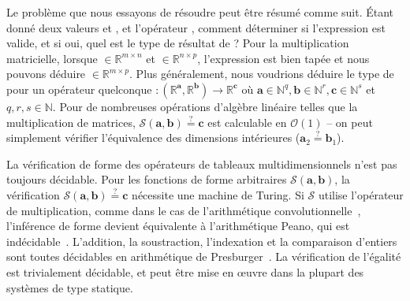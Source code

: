 Le problème que nous essayons de résoudre peut être résumé comme suit. Étant donné deux valeurs  et , et l'opérateur \inline{\$}, comment déterminer si l'expression  est valide, et si oui, quel est le type de résultat de ? Pour la multiplication matricielle, lorsque  $\in \mathbb{R}^{m \times n}$ et  $\in \mathbb{R}^{n \times p}$, l'expression est bien tapée et nous pouvons déduire  $\in \mathbb{R}^{m \times p}$. Plus généralement, nous voudrions déduire le type de  pour un opérateur quelconque  $ : (\mathbb{R}^\mathbf{a}, \mathbb{R}^\mathbf{b}) \rightarrow \mathbb{R}^\mathbf{c}$ où $\mathbf{a} \in \mathbb{N}^q, \mathbf{b} \in \mathbb{N}^r, \mathbf{c} \in \mathbb{N}^s$ et $q, r, s \in \mathbb{N}$. Pour de nombreuses opérations d'algèbre linéaire telles que la multiplication de matrices, $\mathcal{S}(\mathbf a, \mathbf b) \stackrel{?}{=} \mathbf c$ est calculable en $\mathcal{O}(1)$ -- on peut simplement vérifier l'équivalence des dimensions intérieures ($\mathbf{a}_2 \stackrel{?}{=} \mathbf{b}_1$).

La vérification de forme des opérateurs de tableaux multidimensionnels n'est pas toujours décidable. Pour les fonctions de forme arbitraires $\mathcal{S}(\mathbf{a}, \mathbf{b})$, la vérification $\mathcal{S}(\mathbf{a}, \mathbf{b}) \stackrel{?}{=} \mathbf{c}$ nécessite une machine de Turing. Si $\mathcal{S}$ utilise l'opérateur de multiplication, comme dans le cas de l'arithmétique convolutionnelle~\citep{dumoulin2016guide}, l'inférence de forme devient équivalente à l'arithmétique Peano, qui est indécidable~\citep{godel1931formal}. L'addition, la soustraction, l'indexation et la comparaison d'entiers sont toutes décidables en arithmétique de Presburger~\citep{suzuki1980verification, bradley2006decidable, charlier2011enumeration}. La vérification de l'égalité est trivialement décidable, et peut être mise en œuvre dans la plupart des systèmes de type statique.

